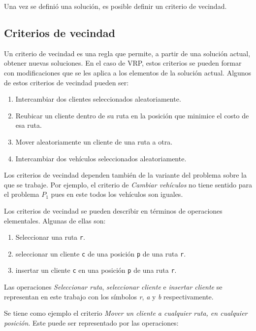 Una vez se definió una solución, es posible definir un criterio de vecindad.

\subsection{Criterios de vecindad}\label{1-criteria}
Un criterio de vecindad es una regla que permite, a partir de una solución actual, obtener nuevas soluciones. En el caso de VRP, estos criterios se pueden formar con modificaciones que se les aplica a los elementos de la solución actual. Algunos de estos criterios de vecindad \cite{Camila, Daniela} pueden ser: 

\begin{enumerate}
	\item Intercambiar dos clientes seleccionados aleatoriamente.
	\item Reubicar un cliente dentro de su ruta en la posición que minimice el costo de esa ruta.
	\item Mover aleatoriamente un cliente de una ruta a otra.
	\item Intercambiar dos vehículos seleccionados aleatoriamente.
\end{enumerate}

Los criterios de vecindad dependen también de la variante del problema sobre la que se trabaje. Por ejemplo, el criterio de \textit{Cambiar vehículos} no tiene sentido para el problema $P_1$ pues en este todos los vehículos son iguales.

Los criterios de vecindad se pueden describir en términos de operaciones elementales. Algunas de ellas son:

\begin{enumerate}
	\item Seleccionar una ruta \texttt{r}. 
	\item seleccionar un cliente \texttt{c} de una posición \texttt{p} de una ruta \texttt{r}.
	\item insertar un cliente \texttt{c} en una posición \texttt{p} de una ruta \texttt{r}.
\end{enumerate}

Las operaciones \textit{Seleccionar ruta}, \textit{seleccionar cliente} e \textit{insertar cliente} se representan en este trabajo con los símbolos \textit{r}, \textit{a} y \textit{b} respectivamente.

Se tiene como ejemplo el criterio \textit{Mover un cliente a cualquier ruta, en cualquier posición}. Este puede ser representado por las operaciones:

